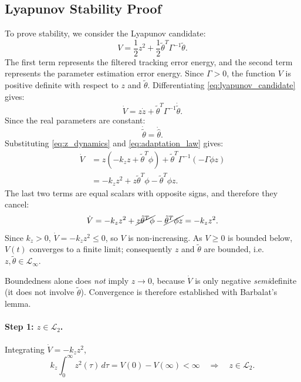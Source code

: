 \subsection{Lyapunov Stability Proof}

To prove stability, we consider the Lyapunov candidate:
\begin{equation}
V
=
\frac{1}{2}z^2
+
\frac{1}{2}\tilde{\theta}^{T}\Gamma^{-1}\tilde{\theta}.
\label{eq:lyapunov_candidate}
\end{equation}
The first term represents the filtered tracking error energy, and the second term represents the parameter estimation error energy. Since \(\Gamma>0\), the function \(V\) is positive definite with respect to \(z\) and \(\tilde{\theta}\). Differentiating \eqref{eq:lyapunov_candidate} gives:
\begin{equation}
\dot{V}
=
z\dot{z}
+
\tilde{\theta}^{T}\Gamma^{-1}\dot{\tilde{\theta}}.
\end{equation}
Since the real parameters are constant:
\begin{equation}
\dot{\tilde{\theta}}
=
\dot{\hat{\theta}}.
\end{equation}
Substituting \eqref{eq:z_dynamics} and \eqref{eq:adaptation_law} gives:
\begin{align}
\dot{V}
&=
z
\left(
-k_z z
+
\tilde{\theta}^{T}\phi
\right)
+
\tilde{\theta}^{T}\Gamma^{-1}
\left(
-\Gamma\phi z
\right)\\
&=
-k_z z^2
+
z\tilde{\theta}^{T}\phi
-
\tilde{\theta}^{T}\phi z.
\end{align}
The last two terms are equal scalars with opposite signs, and therefore they cancel:
\begin{equation}
\dot{V}
=
-k_z z^2
+
\cancel{z\tilde{\theta}^{T}\phi}
-
\cancel{\tilde{\theta}^{T}\phi z}
=
-k_z z^2.
\label{eq:lyapunov_derivative}
\end{equation}
Since $k_z>0$, $\dot V=-k_z z^2\le 0$, so $V$ is non-increasing. As $V\ge 0$ is
bounded below, $V(t)$ converges to a finite limit; consequently $z$ and
$\tilde\theta$ are bounded, i.e. $z,\tilde\theta\in\mathcal{L}_\infty$.

Boundedness alone does \emph{not} imply $z\to 0$, because $\dot V$ is only
negative \emph{semi}definite (it does not involve $\tilde\theta$). Convergence is
therefore established with Barbalat's lemma.

\paragraph{Step 1: $z\in\mathcal{L}_2$.} Integrating $\dot V=-k_z z^2$,
\begin{equation}
k_z\int_0^\infty z^2(\tau)\,d\tau = V(0)-V(\infty)<\infty
\quad\Longrightarrow\quad z\in\mathcal{L}_2 .
\end{equation}


